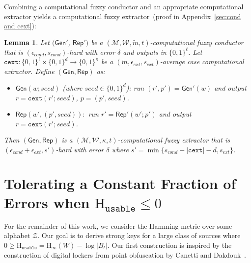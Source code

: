\documentclass[11pt]{article}
\newcommand{\apref}[1]{\mbox{Appendix~\ref{#1}}}
\newcommand{\class}[1]{{\ensuremath{\mathsf{#1}}}}
\newcommand{\gen}{\ensuremath{\class{Gen}}\xspace}
\newcommand{\rep}{\ensuremath{\class{Rep}}\xspace}
\newcommand{\zo}{\ensuremath{\{0, 1\}}}
\newcommand{\Hoo}{\mathrm{H}_\infty}
\newcommand{\Huse}{\mathrm{H}_{\mathtt{usable}}}
\newcommand{\cext}{\ensuremath{\mathtt{cext}}}
\newtheorem{lemma}[theorem]{Lemma}
\begin{document}
Combining a computational fuzzy conductor and an appropriate computational extractor yields a computational fuzzy extractor~(proof in \apref{sec:cond and cext}):

\begin{lemma}
\label{lem:cond and cext}
Let $(\gen'$, $\rep')$ be a $(\mathcal{M}, \mathcal{W}, \tilde{m}, t)$-computational fuzzy conductor that is $(\epsilon_{cond}, s_{cond})$-hard with error $\delta$ and outputs in $\zo^\ell$.  Let $\cext:\zo^\ell\times \zo^d\rightarrow \zo^\kappa$ be a $(\tilde{m}, \epsilon_{ext}, s_{ext})$-average case computational extractor.  Define $(\gen, \rep)$ as:
\begin{itemize}
\item $\gen(w; seed)$ (where $seed\in \zo^d$): run $(r', p')= \gen'(w)$ and output $r = \cext(r'; seed)$, $p = (p', seed)$. 
\item $\rep(w', (p', seed)):$ run $r' = \rep'(w'; p')$ and output $r = \cext(r'; seed)$.
\end{itemize}
Then $(\gen, \rep)$ is a $(\mathcal{M}, \mathcal{W}, \kappa, t)$-computational fuzzy extractor that is $(\epsilon_{cond}+\epsilon_{ext}, s')$-hard with error $\delta$ where $s' = \min\{s_{cond} - |\cext| -d, s_{ext}\}$.
\end{lemma}


\section{Tolerating a Constant Fraction of Errors when $\Huse\le 0$}
\label{sec:construction}
For the remainder of this work, we consider the Hamming metric over some alphabet $\mathcal{Z}$.  Our goal is to derive strong keys for a large class of sources where $0\ge \Huse = \Hoo(W) - \log|B_t|$.
Our first construction is inspired by the construction of digital lockers from point obfuscation by Canetti and Dakdouk~\cite{canetti2008obfuscating}.
\end{document}
